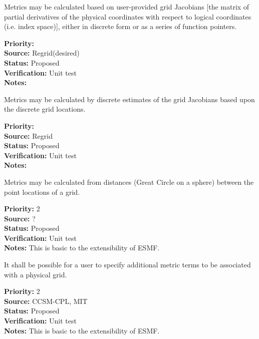 Metrics may be calculated based on user-provided grid Jacobians [the matrix of
partial derivatives of the physical coordinates with respect to logical
coordinates (i.e. index space)], either in discrete form or as a series of function pointers.
\begin{reqlist}
{\bf Priority:}  \\
{\bf Source:} Regrid(desired) \\
{\bf Status:} Proposed \\
{\bf Verification:} Unit test \\
{\bf Notes:} 
\end{reqlist}

Metrics may be calculated by discrete estimates of the grid Jacobians based upon
the discrete grid locations.
\begin{reqlist}
{\bf Priority:}  \\
{\bf Source:} Regrid \\
{\bf Status:} Proposed \\
{\bf Verification:} Unit test \\
{\bf Notes:}
\end{reqlist}

Metrics may be calculated from distances (Great Circle on a sphere) between
the point locations of a grid.
\begin{reqlist}
{\bf Priority:} 2 \\
{\bf Source:} ? \\
{\bf Status:} Proposed \\
{\bf Verification:} Unit test \\
{\bf Notes:} This is basic to the extensibility of ESMF. 
\end{reqlist}

It shall be possible for a user to specify additional metric terms to be associated
with a physical grid.
\begin{reqlist}
{\bf Priority:} 2 \\
{\bf Source:} CCSM-CPL, MIT \\
{\bf Status:} Proposed \\
{\bf Verification:} Unit test \\
{\bf Notes:} This is basic to the extensibility of ESMF. 
\end{reqlist}



